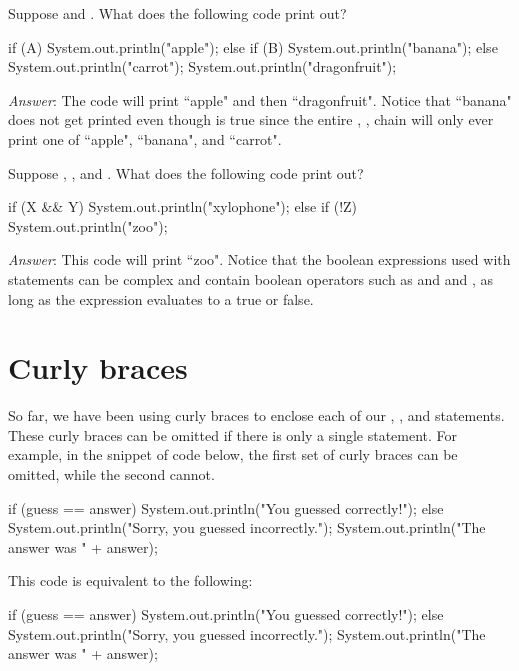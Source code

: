 \begin{example}
Suppose  and . What does the following code print out?

\begin{code}
if (A) {
    System.out.println("apple");
} else if (B) {
    System.out.println("banana");
} else {
    System.out.println("carrot");
} 
System.out.println("dragonfruit");
\end{code}

\emph{Answer}: The code will print ``apple" and then ``dragonfruit". Notice that ``banana" does not get printed even though  is true since the entire , ,  chain will only ever print one of ``apple", ``banana", and ``carrot". 
\end{example}

\begin{example}
Suppose , , and . What does the following code print out?

\begin{code}
if (X && Y) {
    System.out.println("xylophone");
} else if (!Z) {
    System.out.println("zoo");
}
\end{code}

\emph{Answer}: This code will print ``zoo". Notice that the boolean expressions used with  statements can be complex and contain boolean operators such as \ic{\&\&} and \ic{||} and \ic{!}, as long as the expression evaluates to a true or false.
\end{example}

\section{Curly braces}
So far, we have been using curly braces to enclose each of our , , and  statements. These curly braces can be omitted if there is only a single statement. For example, in the snippet of code below, the first set of curly braces can be omitted, while the second cannot.

\begin{code}
if (guess == answer) {
    System.out.println("You guessed correctly!");
} else {
    System.out.println("Sorry, you guessed incorrectly.");
    System.out.println("The answer was " + answer);
} 
\end{code}

This code is equivalent to the following:

\begin{code}
if (guess == answer)
    System.out.println("You guessed correctly!");
else {
    System.out.println("Sorry, you guessed incorrectly.");
    System.out.println("The answer was " + answer);
} 
\end{code}

